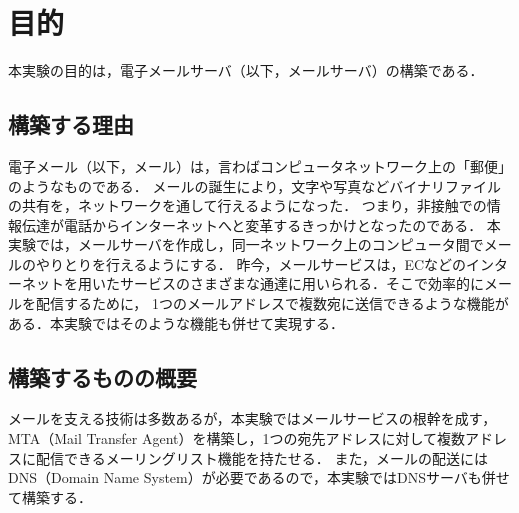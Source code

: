 \section{目的}
本実験の目的は，電子メールサーバ（以下，メールサーバ）の構築である．
\subsection{構築する理由}
電子メール（以下，メール）は，言わばコンピュータネットワーク上の「郵便」のようなものである．
メールの誕生により，文字や写真などバイナリファイルの共有を，ネットワークを通して行えるようになった．
つまり，非接触での情報伝達が電話からインターネットへと変革するきっかけとなったのである．
本実験では，メールサーバを作成し，同一ネットワーク上のコンピュータ間でメールのやりとりを行えるようにする．
昨今，メールサービスは，ECなどのインターネットを用いたサービスのさまざまな通達に用いられる．そこで効率的にメールを配信するために，
1つのメールアドレスで複数宛に送信できるような機能がある．本実験ではそのような機能も併せて実現する．

\subsection{構築するものの概要}
メールを支える技術は多数あるが，本実験ではメールサービスの根幹を成す，MTA（Mail Transfer Agent）を構築し，1つの宛先アドレスに対して複数アドレスに配信できるメーリングリスト機能を持たせる．
また，メールの配送にはDNS（Domain Name System）が必要であるので，本実験ではDNSサーバも併せて構築する．